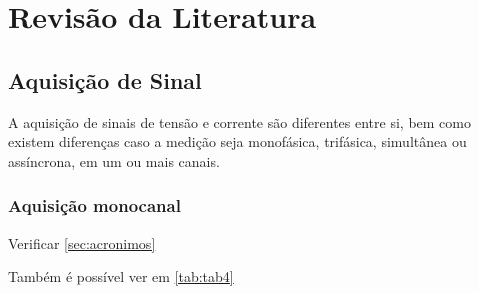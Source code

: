 
\chapter{Revisão da Literatura}\label{cap:revisaodaliteratura}

\section{Aquisição de Sinal}\label{sec:aqsinal}
A aquisição de sinais de tensão e corrente são diferentes entre si, bem como existem diferenças caso a medição seja monofásica, trifásica, simultânea ou assíncrona, em um ou mais canais.

\subsection{Aquisição monocanal}\label{subsec:monocanal}

Verificar \ref{sec:acronimos}

Também é possível ver em \ref{tab:tab4}